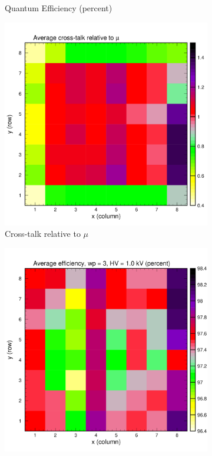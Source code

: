 \begin{figure}[hbt]
\begin{subfigure}[c]{0.24\linewidth}
		\caption{Quantum Efficiency (percent)}
		\vspace{0mm}
	\end{subfigure}%
	\vspace{3mm}
	\begin{subfigure}[c]{0.24\linewidth}
		\centering
		\includegraphics[width=\linewidth, trim={0mm 0mm 0mm 19mm},clip]{figures/pglobal_beta.pdf}
		\caption{Cross-talk relative to $\mu$}
		\vspace{0mm}
	\end{subfigure}%
	\begin{subfigure}[c]{0.24\linewidth}
		\centering
		\includegraphics[width=\linewidth, trim={0mm 0mm 0mm 19mm},clip]{figures/pglobal_eff2d.pdf}

\end{subfigure}
\end{figure}
